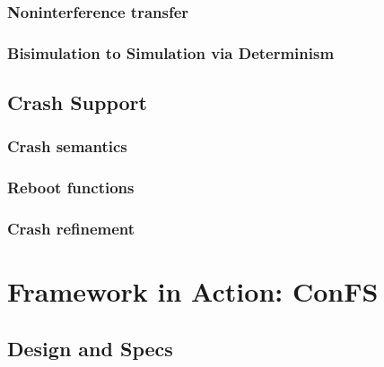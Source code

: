 \documentclass[onecolumn]{paper}
\begin{document}
		\subsubsection{Noninterference transfer}
		\subsubsection{Bisimulation to Simulation via Determinism}

	\subsection{Crash Support}
		\subsubsection{Crash semantics} 
		\subsubsection{Reboot functions}
		\subsubsection{Crash refinement}
\newpage
\section{Framework in Action: ConFS}
	\subsection{Design and Specs}
\end{document}
